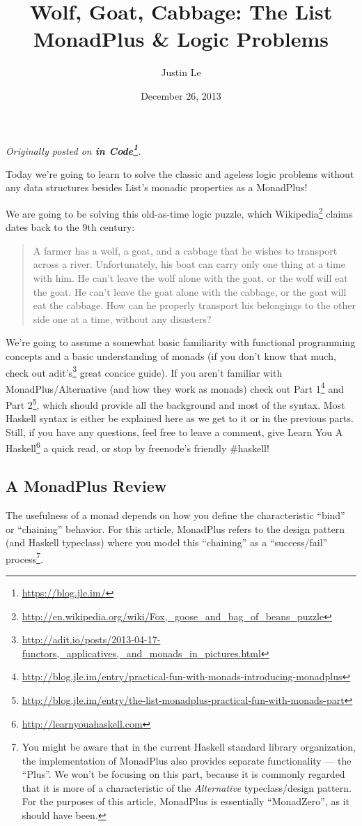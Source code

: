 \documentclass[]{article}
\title{Wolf, Goat, Cabbage: The List MonadPlus \& Logic Problems}
\author{Justin Le}
\date{December 26, 2013}
\renewcommand{\href}[2]{#2\footnote{\url{#1}}}
\begin{document}
\maketitle

\emph{Originally posted on \textbf{\href{https://blog.jle.im/}{in
Code}}.}

Today we're going to learn to solve the classic and ageless logic
problems without any data structures besides List's monadic properties
as a MonadPlus!

We are going to be solving this old-as-time logic puzzle, which
\href{http://en.wikipedia.org/wiki/Fox,_goose_and_bag_of_beans_puzzle}{Wikipedia}
claims dates back to the 9th century:

\begin{quote}
A farmer has a wolf, a goat, and a cabbage that he wishes to transport
across a river. Unfortunately, his boat can carry only one thing at a
time with him. He can't leave the wolf alone with the goat, or the wolf
will eat the goat. He can't leave the goat alone with the cabbage, or
the goat will eat the cabbage. How can he properly transport his
belongings to the other side one at a time, without any disasters?
\end{quote}

We're going to assume a somewhat basic familiarity with functional
programming concepts and a basic understanding of monads (if you don't
know that much, check out
\href{http://adit.io/posts/2013-04-17-functors,_applicatives,_and_monads_in_pictures.html}{adit's}
great concice guide). If you aren't familiar with MonadPlus/Alternative
(and how they work as monads) check out
\href{http://blog.jle.im/entry/practical-fun-with-monads-introducing-monadplus}{Part
1} and
\href{http://blog.jle.im/entry/the-list-monadplus-practical-fun-with-monads-part}{Part
2}, which should provide all the background and most of the syntax. Most
Haskell syntax is either be explained here as we get to it or in the
previous parts. Still, if you have any questions, feel free to leave a
comment, give \href{http://learnyouahaskell.com}{Learn You A Haskell} a
quick read, or stop by freenode's friendly \#haskell!

\subsection{A MonadPlus Review}\label{a-monadplus-review}

The usefulness of a monad depends on how you define the characteristic
``bind'' or ``chaining'' behavior. For this article, MonadPlus refers to
the design pattern (and Haskell typeclass) where you model this
``chaining'' as a ``success/fail'' process\footnote{You might be aware
  that in the current Haskell standard library organization, the
  implementation of MonadPlus also provides separate functionality ---
  the ``Plus''. We won't be focusing on this part, because it is
  commonly regarded that it is more of a characteristic of the
  \emph{Alternative} typeclass/design pattern. For the purposes of this
  article, MonadPlus is essentially ``MonadZero'', as it should have
  been.}.
\end{document}
